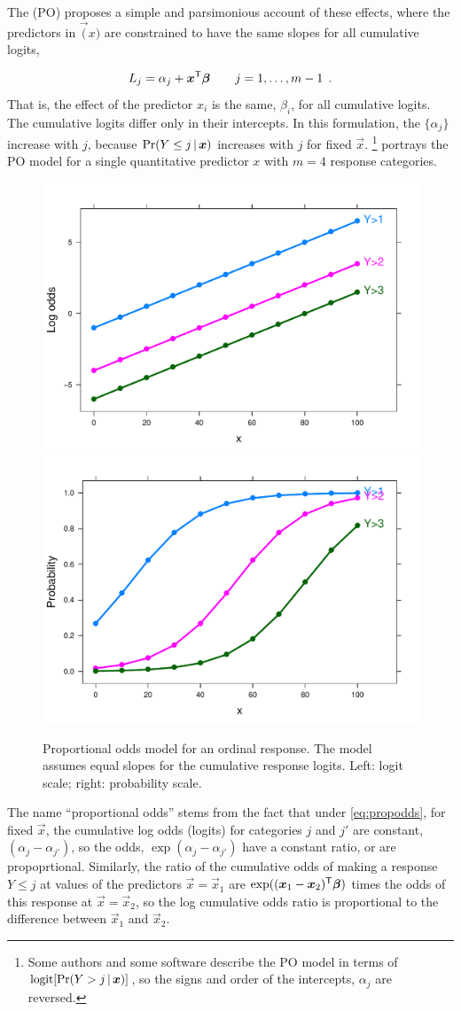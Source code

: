 \documentclass[11pt]{book}\usepackage[]{graphicx}\usepackage[]{color}
\begin{document}
The  (PO) \citep{Mccullagh:1980} proposes a simple
and parsimonious account of these effects, where the predictors in $\vec(x)$
are constrained to have the same slopes for all cumulative logits,

\begin{equation}\label{eq:propodds}
  L_j = \alpha_j + \bm{x}^\mathsf{T} \bm{\beta} \quad\quad j=1, \dots , m-1 \:\: .
\end{equation}
That is, the effect of the predictor $x_i$ is the same, $\beta_i$, for all
cumulative logits. The cumulative logits differ only in their intercepts.
In this formulation, the $\{ \alpha_j \}$ increase with $j$, because
$\Pr (Y \le j \, | \, \bm{x})$ increases with $j$ for fixed $\vec{x}$.%
\footnote{
Some authors and some software describe the PO model in terms of
$\logit [\Pr (Y > j \given \vec{x})]$, so the signs and order of the
intercepts, $\alpha_j$ are reversed.
}
 portrays the PO model for a single quantitative predictor
$x$ with $m=4$ response categories.  

\begin{figure}
 \centering
 \includegraphics[width=.49\textwidth]{ch07/fig/podds2}
 \includegraphics[width=.49\textwidth]{ch07/fig/podds1}
 \caption{Proportional odds model for an ordinal response.  The model assumes equal slopes for the cumulative response logits. Left: logit scale; right: probability scale.}
 \label{fig:podds}
\end{figure}

The name ``proportional odds'' stems from the fact that under \eqref{eq:propodds},
for fixed $\vec{x}$, the cumulative log odds (logits) for categories $j$ and $j\prime$
are constant, $(\alpha_j - \alpha_{j\prime})$, so the odds, $\exp (\alpha_j - \alpha_{j\prime})$
have a constant ratio, or are propoprtional.
Similarly, 
the ratio of the cumulative odds of making a response $Y \le j$ at values of the
predictors $\vec{x} = \vec{x}_1$ are $\exp( (\bm{x}_1 - \bm{x}_2)^\mathsf{T} \bm{\beta} )$
times the odds of this response at $\vec{x} = \vec{x}_2$, so the log cumulative odds
ratio is proportional to the difference between $\vec{x}_1$ and $\vec{x}_2$.
\end{document}
